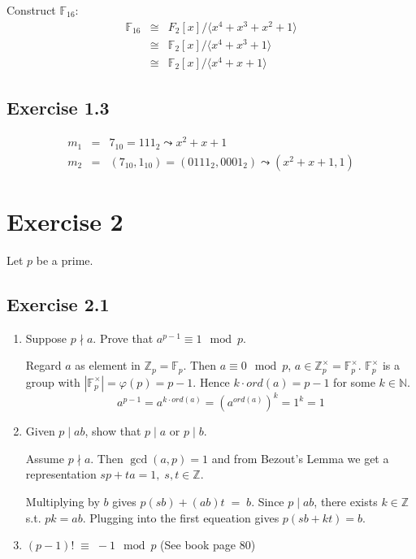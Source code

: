 \documentclass[a4paper]{scrreprt}
\newcommand\N{\mathbb N}
\newcommand\Z{\mathbb Z}
\newcommand\F{\mathbb F}
\begin{document}
Construct $\F_{16}$:\begin{eqnarray*}
    \F_{16} &\cong& F_2[x] / \langle x^4+x^3+x^2+1 \rangle\\
    &\cong& \F_2[x] / \langle x^4+x^3+1 \rangle\\
    &\cong& \F_2[x] / \langle x^4+x+1 \rangle
\end{eqnarray*}

\subsection*{Exercise 1.3}

\begin{eqnarray*}
    m_1 &=& 7_{10} = 111_2 \leadsto x^2+x+1\\
    m_2 &=& (7_{10}, 1_{10}) = (0111_2, 0001_2) \leadsto (x^2+x+1, 1)
\end{eqnarray*}

\section*{Exercise 2}

Let $p$ be a prime.

\subsection*{Exercise 2.1}

\begin{enumerate}[label=\alph*)]
    \item Suppose $p\nmid a$. Prove that $a^{p-1} \equiv 1\mod p$.

        Regard $a$ as element in $\Z_p=\F_p$. Then $a\equiv 0\mod p$, $a\in\Z_p^\times = \F_p^\times$.
        $\F_p^\times$ is a group with $|\F_p^\times| = \varphi(p) = p-1$. Hence $k\cdot ord(a)=p-1$
        for some $k\in\N$.  \[a^{p-1}=a^{k\cdot ord(a)} = \left(a^{ord(a)}\right)^k = 1^k = 1\]

    \item Given $p\mid ab$, show that $p\mid a$ or $p\mid b$.

        Assume $p\nmid a$. Then $\gcd(a,p)=1$ and from Bezout's Lemma we get a representation
        $sp+ta=1,\;s,t\in\Z$.

        Multiplying by $b$ gives $p(sb)+(ab)t\;=\;b$. Since $p\mid ab$, there exists $k\in\Z$ s.t.
        $pk=ab$. Plugging into the first equeation gives $p(sb+kt)=b$.

    \item $(p-1)! \;\equiv\; -1\mod p$ (See book page 80)
\end{enumerate}
\end{document}
